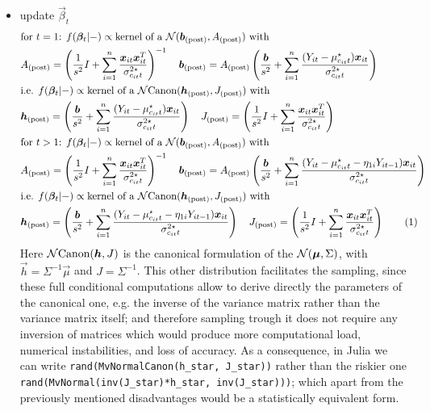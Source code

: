 \documentclass[12pt,	%
	a4paper,		%
	twoside,		%
	openright,		%
	titlepage,%
	]{book}
\newcommand\numberthis{\addtocounter{equation}{1}\tag{\theequation}}
\theoremstyle{definition}
\newcommand{\mjline}[1]{\texttt{#1}}
\begin{document}
\begin{itemize}
\item update $\vec{\beta}_t$
\begin{align*}
&  \text{for $t=1$} \text{: }
  f(\vec{\beta}_t|-) \propto \text{kernel of a $\N(\vec{b}_\post, A_\post)$ with}\\
 &A_\post = \left( \frac{1}{s^2}I + \sum_{i=1}^n \frac{\vec{x}_{it}\vec{x}_{it}^T}{\sigma^{2\star}_{c_{it}t}}\right)^{-1} \quad
\vec{b}_\post = A_\post \left( \frac{\vec{b}}{s^2} +\sum_{i=1}^n \frac{(Y_{it}-\mu^\star_{c_{it}t})\vec{x}_{it}}{\sigma^{2\star}_{c_{it}t}} \right) \\
&\text{i.e. } f(\vec{\beta}_t|-) \propto \text{kernel of a $\Ncan(\vec{h}_\post, J_\post)$ with}\\
&\vec{h}_\post = \left( \frac{\vec{b}}{s^2} +\sum_{i=1}^n \frac{(Y_{it}-\mu^\star_{c_{it}t})\vec{x}_{it}}{\sigma^{2\star}_{c_{it}t}} \right) \quad
J_\post = \left( \frac{1}{s^2}I + \sum_{i=1}^n \frac{\vec{x}_{it}\vec{x}_{it}^T}{\sigma^{2\star}_{c_{it}t}}\right)\\
& \text{for $t>1$} \text{: }
 f(\vec{\beta}_t|-) \propto \text{kernel of a $\N(\vec{b}_\post, A_\post)$ with}\\
 &A_\post = \left( \frac{1}{s^2}I + \sum_{i=1}^n \frac{\vec{x}_{it}\vec{x}_{it}^T}{\sigma^{2\star}_{c_{it}t}}\right)^{-1} \quad
\vec{b}_\post = A_\post \left( \frac{\vec{b}}{s^2} +\sum_{i=1}^n \frac{(Y_{it}-\mu^\star_{c_{it}t}- \eta_{1i}Y_{it-1})\vec{x}_{it}}{\sigma^{2\star}_{c_{it}t}} \right) \\
 &\text{i.e. } f(\vec{\beta}_t|-) \propto \text{kernel of a $\Ncan(\vec{h}_\post, J_\post)$ with}\\
&\vec{h}_\post = \left( \frac{\vec{b}}{s^2} +\sum_{i=1}^n \frac{(Y_{it}-\mu^\star_{c_{it}t}- \eta_{1i}Y_{it-1})\vec{x}_{it}}{\sigma^{2\star}_{c_{it}t}} \right) \quad
J_\post  = \left( \frac{1}{s^2}I + \sum_{i=1}^n \frac{\vec{x}_{it}\vec{x}_{it}^T}{\sigma^{2\star}_{c_{it}t}}\right)
 \numberthis \label{update betat}
\end{align*}
Here $\mathcal{N}\text{Canon}(\boldsymbol{h},J)$ is the canonical formulation of the $\mathcal{N}(\boldsymbol{\mu},\Sigma)$, with $\vec{h} = \Sigma^{-1}\vec{\mu}$ and $J = \Sigma^{-1}$. This other distribution facilitates the sampling, since these full conditional computations allow to derive directly the parameters of the canonical one, e.g. the inverse of the variance matrix rather than the variance matrix itself; and therefore sampling trough it does not require any inversion of matrices which would produce more computational load, numerical instabilities, and loss of accuracy. As a consequence, in Julia we can write
\mjline{rand(MvNormalCanon(h_star, J_star))}
rather than the riskier one
\mjline{rand(MvNormal(inv(J_star)*h_star, inv(J_star)))}; which apart from the previously mentioned disadvantages would be a statistically equivalent form.



\end{itemize}
\end{document}
